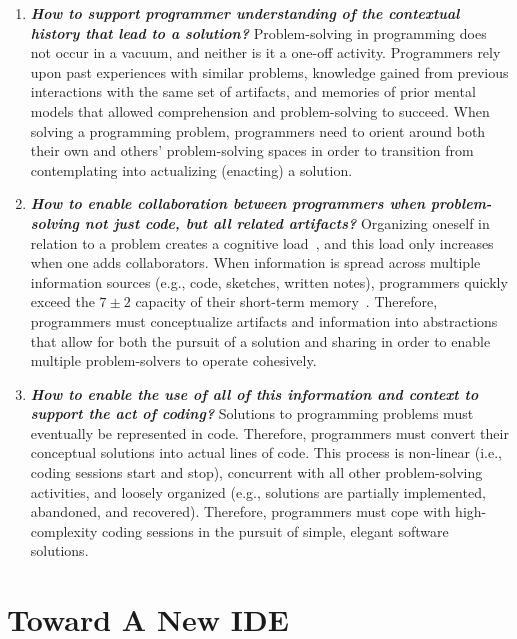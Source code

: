 \documentclass{ppig}
\begin{document}
\begin{enumerate}
  \item \textit{\textbf{How to support programmer understanding of the contextual history that lead to a solution?}}
  Problem-solving in programming does not occur in a vacuum, and neither is it a one-off activity.
  Programmers rely upon past experiences with similar problems, knowledge gained from previous interactions with the same set of artifacts, and memories of prior mental models that allowed comprehension and problem-solving to succeed.
  When solving a programming problem, programmers need to orient around both their own and others' problem-solving spaces in order to transition from contemplating into actualizing (enacting) a solution.
  
  \item \textit{\textbf{How to enable collaboration between programmers when problem-solving not just code, but all related artifacts?}}
  Organizing oneself in relation to a problem creates a cognitive load~\cite{sweller1988cognitive}, and this load only increases when one adds collaborators.
  When information is spread across multiple information sources (e.g., code, sketches, written notes), programmers quickly exceed the $7\pm2$ capacity of their short-term memory~\cite{lisman1995storage}.
  Therefore, programmers must conceptualize artifacts and information into abstractions that allow for both the pursuit of a solution and sharing in order to enable multiple problem-solvers to operate cohesively.
  
  \item \textit{\textbf{How to enable the use of all of this information and context to support the act of coding?}}
  Solutions to programming problems must eventually be represented in code.
  Therefore, programmers must convert their conceptual solutions into actual lines of code.
  This process is non-linear (i.e., coding sessions start and stop), concurrent with all other problem-solving activities, and loosely organized (e.g., solutions are partially implemented, abandoned, and recovered).
  Therefore, programmers must cope with high-complexity coding sessions in the pursuit of simple, elegant software solutions.
\end{enumerate}

\section{Toward A New IDE}
\end{document}
